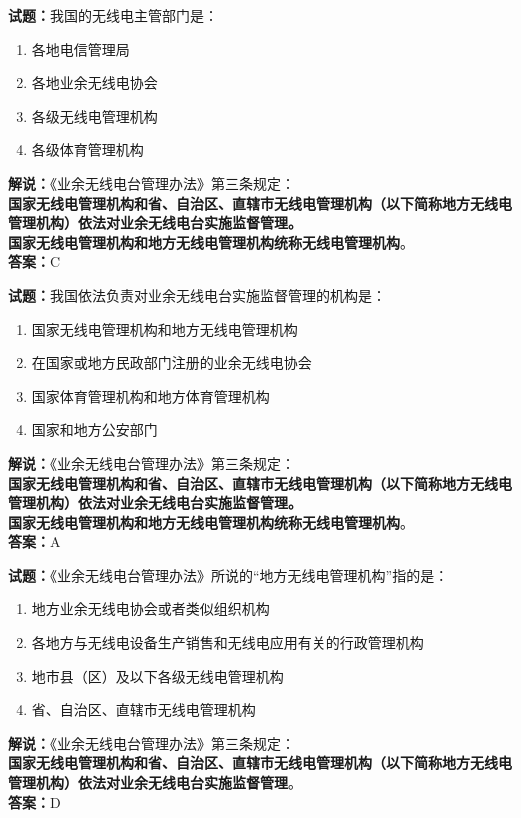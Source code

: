 \documentclass{ctexbook}
\begin{document}
\bigskip




\noindent\textbf{试题：}我国的无线电主管部门是：
\begin{enumerate}[leftmargin=3em]
\item 各地电信管理局
\item 各地业余无线电协会
\item 各级无线电管理机构
\item 各级体育管理机构
\end{enumerate}
\noindent\textbf{解说：}《业余无线电台管理办法》第三条规定：\\\textbf{国家无线电管理机构和省、自治区、直辖市无线电管理机构（以下简称地方无线电管理机构）依法对业余无线电台实施监督管理。\\
国家无线电管理机构和地方无线电管理机构统称无线电管理机构}。\\\noindent\textbf{答案：}C

\bigskip




\noindent\textbf{试题：}我国依法负责对业余无线电台实施监督管理的机构是：
\begin{enumerate}[leftmargin=3em]
\item 国家无线电管理机构和地方无线电管理机构
\item 在国家或地方民政部门注册的业余无线电协会
\item 国家体育管理机构和地方体育管理机构
\item 国家和地方公安部门
\end{enumerate}
\noindent\textbf{解说：}《业余无线电台管理办法》第三条规定：\\\textbf{国家无线电管理机构和省、自治区、直辖市无线电管理机构（以下简称地方无线电管理机构）依法对业余无线电台实施监督管理。\\
国家无线电管理机构和地方无线电管理机构统称无线电管理机构}。\\\noindent\textbf{答案：}A


\bigskip




\noindent\textbf{试题：}《业余无线电台管理办法》所说的“地方无线电管理机构”指的是：
\begin{enumerate}[leftmargin=3em]
\item 地方业余无线电协会或者类似组织机构
\item 各地方与无线电设备生产销售和无线电应用有关的行政管理机构
\item 地市县（区）及以下各级无线电管理机构
\item 省、自治区、直辖市无线电管理机构
\end{enumerate}
\noindent\textbf{解说：}《业余无线电台管理办法》第三条规定：\\\textbf{国家无线电管理机构和省、自治区、直辖市无线电管理机构（以下简称地方无线电管理机构）依法对业余无线电台实施监督管理}。\\\noindent\textbf{答案：}D
\end{document}
